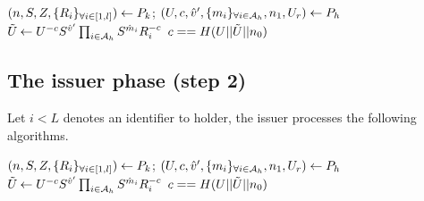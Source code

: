 \documentclass{article}
\begin{document}
\begin{algorithm}
\caption{$verify_{P_{h}}(P_{k}, P_{h})$}
\label{alg:ci1verify}
\begin{algorithmic}
	\State $(n, S, Z, \{R_i\}_{\forall i\in [1,l]}) \leftarrow P_{k}$; $(U, c, \hat{v}', \{m_{i}\}_{\forall i\in \mathcal{A}_{h}},n_{1}, U_{r}) \leftarrow P_{h}$
	\State $\tilde{U}_{}\leftarrow U_{}^{-c}S^{\hat{v}{'}}\prod _{i\in \mathcal{A}_{h}}S^{\hat{m}_{i}}R_{i}^{-c}$
	\State \Return $c == H(U||\tilde{U}||n_{0})$
\end{algorithmic}
\end{algorithm}

\clearpage
\subsection{The issuer phase (step 2)}
Let $i<L$ denotes an identifier to holder, the issuer processes the following algorithms.
\begin{algorithm}
\caption{$verify_{P_{h}}(P_{k}, P_{h})$}
\label{alg:civerify}
\begin{algorithmic}
	\State $(n, S, Z, \{R_i\}_{\forall i\in [1,l]}) \leftarrow P_{k}$; $(U, c, \hat{v}', \{m_{i}\}_{\forall i\in \mathcal{A}_{h}},n_{1}, U_{r}) \leftarrow P_{h}$
	\State $\tilde{U}_{}\leftarrow U_{}^{-c}S^{\hat{v}{'}}\prod _{i\in \mathcal{A}_{h}}S^{\hat{m}_{i}}R_{i}^{-c}$
	\State \Return $c == H(U||\tilde{U}||n_{0})$
\end{algorithmic}
\end{algorithm}
\end{document}
